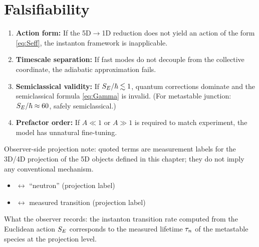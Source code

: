 \section{Falsifiability}
\label{sec:instanton:falsify}

\begin{edcopenbox}[title=Falsifiability Hooks]
    \begin{enumerate}
        \item \textbf{Action form:} If the 5D$\to$1D reduction does not yield
              an action of the form \eqref{eq:Seff}, the instanton framework
              is inapplicable.

        \item \textbf{Timescale separation:} If fast modes do not decouple
              from the collective coordinate, the adiabatic approximation fails.

        \item \textbf{Semiclassical validity:} If $S_E/\hbar \lesssim 1$,
              quantum corrections dominate and the semiclassical formula
              \eqref{eq:Gamma} is invalid. (For metastable junction: $S_E/\hbar \approx 60$,
              safely semiclassical.)

        \item \textbf{Prefactor order:} If $A \ll 1$ or $A \gg 1$ is required
              to match experiment, the model has unnatural fine-tuning.
    \end{enumerate}
\end{edcopenbox}


\begin{observerbox}
Observer-side projection note: quoted terms are measurement labels for the
3D/4D projection of the 5D objects defined in this chapter; they do not
imply any conventional mechanism.

\begin{itemize}
    \item \MetastableJunction{} $\leftrightarrow$ ``neutron'' (projection label)
    \item \JunctionTransition{} $\leftrightarrow$ measured transition (projection label)
\end{itemize}

What the observer records: the instanton transition rate computed from the
Euclidean action $S_E$ corresponds to the measured lifetime $\tau_n$ of the
metastable species at the projection level.
\end{observerbox}

